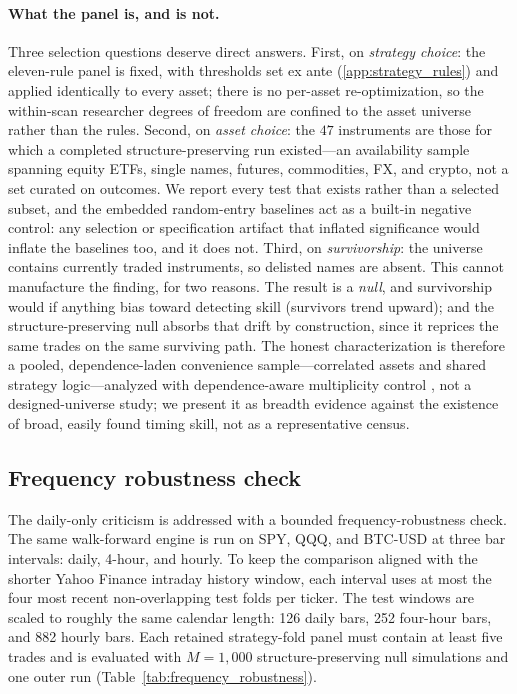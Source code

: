 \documentclass[preprint,12pt]{elsarticle}
\theoremstyle{definition}
\begin{document}
\paragraph{What the panel is, and is not.} Three selection questions deserve direct answers. First, on \emph{strategy choice}: the eleven-rule panel is fixed, with thresholds set ex ante (\ref{app:strategy_rules}) and applied identically to every asset; there is no per-asset re-optimization, so the within-scan researcher degrees of freedom are confined to the asset universe rather than the rules. Second, on \emph{asset choice}: the $47$ instruments are those for which a completed structure-preserving run existed---an availability sample spanning equity ETFs, single names, futures, commodities, FX, and crypto, not a set curated on outcomes. We report every test that exists rather than a selected subset, and the embedded random-entry baselines act as a built-in negative control: any selection or specification artifact that inflated significance would inflate the baselines too, and it does not. Third, on \emph{survivorship}: the universe contains currently traded instruments, so delisted names are absent. This cannot manufacture the finding, for two reasons. The result is a \emph{null}, and survivorship would if anything bias toward detecting skill (survivors trend upward); and the structure-preserving null absorbs that drift by construction, since it reprices the same trades on the same surviving path. The honest characterization is therefore a pooled, dependence-laden convenience sample---correlated assets and shared strategy logic---analyzed with dependence-aware multiplicity control \cite{benjaminihochberg1995,BenjaminiYekutieli2001}, not a designed-universe study; we present it as breadth evidence against the existence of broad, easily found timing skill, not as a representative census.

\subsection{Frequency robustness check}
\label{sec:frequency-robustness}

The daily-only criticism is addressed with a bounded frequency-robustness check. The same walk-forward engine is run on SPY, QQQ, and BTC-USD at three bar intervals: daily, 4-hour, and hourly. To keep the comparison aligned with the shorter Yahoo Finance intraday history window, each interval uses at most the four most recent non-overlapping test folds per ticker. The test windows are scaled to roughly the same calendar length: 126 daily bars, 252 four-hour bars, and 882 hourly bars. Each retained strategy-fold panel must contain at least five trades and is evaluated with $M=1{,}000$ structure-preserving null simulations and one outer run (Table~\ref{tab:frequency_robustness}).
\end{document}
